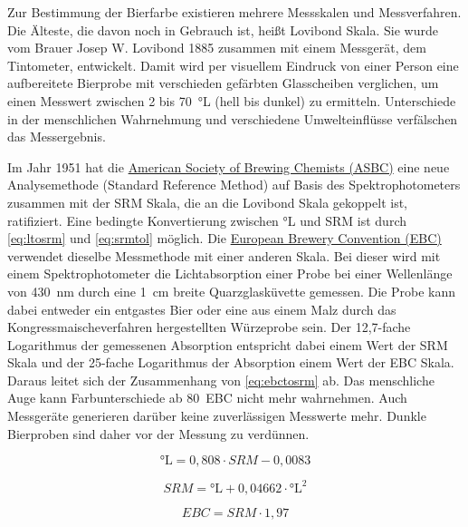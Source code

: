 \documentclass[a4paper,parskip=half]{scrartcl}
\newcommand{\EBC}{\mathit{EBC}}
\newcommand{\SRM}{\mathit{SRM}}
\begin{document}
Zur Bestimmung der Bierfarbe existieren mehrere Messskalen und Messverfahren. Die Älteste, die davon noch in Gebrauch ist, heißt Lovibond Skala. Sie wurde vom Brauer Josep W. Lovibond 1885 zusammen mit einem Messgerät, dem Tintometer, entwickelt. Damit wird per visuellem Eindruck von einer Person eine aufbereitete Bierprobe mit verschieden gefärbten Glasscheiben verglichen, um einen Messwert zwischen 2 bis 70~°L (hell bis dunkel) zu ermitteln. Unterschiede in der menschlichen Wahrnehmung und verschiedene Umwelteinflüsse verfälschen das Messergebnis. \parencite{KrausWeyermann2021a}

Im Jahr 1951 hat die \href{https://www.asbcnet.org}{American Society of Brewing Chemists (ASBC)} eine neue Analysemethode (Standard Reference Method) auf Basis des Spektrophotometers zusammen mit der SRM Skala, die an die Lovibond Skala gekoppelt ist, ratifiziert. Eine bedingte Konvertierung zwischen °L und SRM ist durch \autoref{eq:ltosrm} und \autoref{eq:srmtol} möglich. Die \href{https://europeanbreweryconvention.eu}{European Brewery Convention (EBC)} verwendet dieselbe Messmethode mit einer anderen Skala. Bei dieser wird mit einem Spektrophotometer die Lichtabsorption einer Probe bei einer Wellenlänge von 430~nm durch eine 1~cm breite Quarzglasküvette gemessen. Die Probe kann dabei entweder ein entgastes Bier oder eine aus einem Malz durch das Kongressmaischeverfahren hergestellten Würzeprobe sein. Der 12,7-fache Logarithmus der gemessenen Absorption entspricht dabei einem Wert der SRM Skala und der 25-fache Logarithmus der Absorption einem Wert der EBC Skala. Daraus leitet sich der Zusammenhang von \autoref{eq:ebctosrm} ab. Das menschliche Auge kann Farbunterschiede ab 80~EBC nicht mehr wahrnehmen. Auch Messgeräte generieren darüber keine zuverlässigen Messwerte mehr. Dunkle Bierproben sind daher vor der Messung zu verdünnen. \parencite{KrausWeyermann2021a}

\begin{equation}
\textrm{°L} = 0,808 \cdot \SRM - 0,0083
\label{eq:ltosrm}
\end{equation}

\begin{equation}
\SRM = \textrm{°L} + 0,04662 \cdot \textrm{°L}^2
\label{eq:srmtol}
\end{equation}

\begin{equation}
\EBC = \SRM \cdot 1,97
\label{eq:ebctosrm}
\end{equation}

\parencite{Bies2010}
\parencite{Tucker2017}
\parencite{Lange2016}
\parencite{Shellhammer2009}
\end{document}
